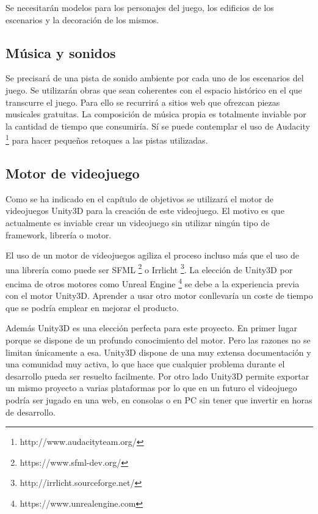 Se necesitarán modelos para los personajes del juego, los edificios de los escenarios y la decoración de los mismos.

\subsection{Música y sonidos}

Se precisará de una pista de sonido ambiente por cada uno de los escenarios del juego. Se utilizarán obras que sean coherentes con el espacio histórico en el que transcurre el juego. Para ello se recurrirá a sitios web que ofrezcan piezas musicales gratuitas. La composición de música propia es totalmente inviable por la cantidad de tiempo que consumiría. Sí se puede contemplar el uso de Audacity \footnote{http://www.audacityteam.org/} para hacer pequeños retoques a las pistas utilizadas.

\subsection{Motor de videojuego}

Como se ha indicado en el capítulo de objetivos se utilizará el motor de videojuegos Unity3D para la creación de este videojuego. El motivo es que actualmente es inviable crear un videojuego sin utilizar ningún tipo de framework, librería o motor. 

El uso de un motor de videojuegos agiliza el proceso incluso más que el uso de una librería como puede ser SFML \footnote{https://www.sfml-dev.org/} o Irrlicht \footnote{http://irrlicht.sourceforge.net/}. La elección de Unity3D por encima de otros motores como Unreal Engine \footnote{https://www.unrealengine.com} se debe a la experiencia previa con el motor Unity3D. Aprender a usar otro motor conllevaría un coste de tiempo que se podría emplear en mejorar el producto. 

Además Unity3D es una elección perfecta para este proyecto. En primer lugar porque se dispone de un profundo conocimiento del motor. Pero las razones no se limitan únicamente a esa. Unity3D dispone de una muy extensa documentación y una comunidad muy activa, lo que hace que cualquier problema durante el desarrollo pueda ser resuelto facilmente. Por otro lado Unity3D permite exportar un mismo proyecto a varias plataformas por lo que en un futuro el videojuego podría ser jugado en una web, en consolas o en PC sin tener que invertir en horas de desarrollo.